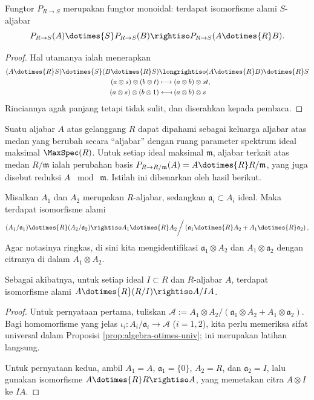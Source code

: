 \begin{proposition}\label{prop:algebra-base-change-monoidal}
	Fungtor $P_{R \to S}$ merupakan fungtor monoidal: terdapat isomorfisme alami $S$-aljabar
	\[ P_{R \to S}(A) \dotimes{S} P_{R \to S}(B) \rightiso P_{R \to S}(A \dotimes{R} B). \]
\end{proposition}
\begin{proof}
	Hal utamanya ialah menerapkan
	\begin{align*}
		(A \dotimes{R} S) \dotimes{S} (B \dotimes{R} S) & \longrightiso (A \dotimes{R} B) \dotimes{R} S \\
		(a \otimes s) \otimes (b \otimes t) & \longmapsto (a \otimes b) \otimes st, \\
		(a \otimes s) \otimes (b \otimes 1) & \longmapsfrom (a \otimes b) \otimes s
	\end{align*}
	Rinciannya agak panjang tetapi tidak sulit, dan diserahkan kepada pembaca.
\end{proof}

Suatu aljabar $A$ atas gelanggang $R$ dapat dipahami sebagai keluarga aljabar atas medan yang berubah secara ``aljabar'' dengan ruang parameter spektrum ideal maksimal $\MaxSpec(R)$. Untuk setiap ideal maksimal $\mathfrak{m}$, aljabar terkait atas medan $R/\mathfrak{m}$ ialah perubahan basis $P_{R \to R/\mathfrak{m}} (A) = A \dotimes{R} R/\mathfrak{m}$, yang juga disebut reduksi $A$ $\bmod\; \mathfrak{m}$. Istilah ini dibenarkan oleh hasil berikut.
\begin{lemma}
	Misalkan $A_1$ dan $A_2$ merupakan $R$-aljabar, sedangkan $\mathfrak{a}_i \subset A_i$ ideal. Maka terdapat isomorfisme alami
	\[ (A_1/\mathfrak{a}_1) \dotimes{R} (A_2/\mathfrak{a}_2) \rightiso A_1 \dotimes{R} A_2 \bigg/ \left( \mathfrak{a}_1 \dotimes{R} A_2 + A_1 \dotimes{R} \mathfrak{a}_2\right), \]
	Agar notasinya ringkas, di sini kita mengidentifikasi $\mathfrak{a}_1 \otimes A_2$ dan $A_1 \otimes \mathfrak{a}_2$ dengan citranya di dalam $A_1 \otimes A_2$.
	
	Sebagai akibatnya, untuk setiap ideal $I \subset R$ dan $R$-aljabar $A$, terdapat isomorfisme alami $A \dotimes{R} (R/I) \rightiso A/IA$.
\end{lemma}
\begin{proof}
	Untuk pernyataan pertama, tuliskan $\mathscr{A} := A_1 \otimes A_2 \big/ \left( \mathfrak{a}_1 \otimes A_2 + A_1 \otimes \mathfrak{a}_2\right)$. Bagi homomorfisme yang jelas $\iota_i: A_i/\mathfrak{a}_i \to \mathscr{A}$ ($i=1,2$), kita perlu memeriksa sifat universal dalam Proposisi \ref{prop:algebra-otimes-univ}; ini merupakan latihan langsung.

	Untuk pernyataan kedua, ambil $A_1 = A$, $\mathfrak{a}_1=\{0\}$, $A_2 = R$, dan $\mathfrak{a}_2 = I$, lalu gunakan isomorfisme $A \dotimes{R} R \rightiso A$, yang memetakan citra $A \otimes I$ ke $IA$.
\end{proof}

